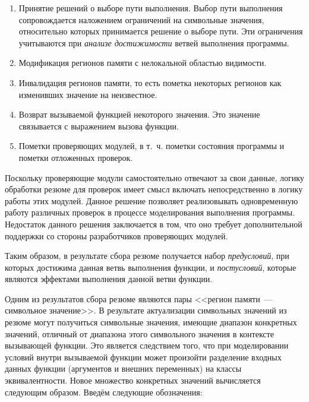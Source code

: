 \begin{enumerate}[leftmargin=1em]
 \item Принятие решений о выборе пути выполнения. Выбор пути выполнения сопровождается наложением ограничений на символьные значения, относительно которых принимается решение о выборе пути. Эти ограничения учитываются при \textit{анализе достижимости} ветвей выполнения программы.
 
 \item Модификация регионов памяти с нелокальной областью видимости.
 
 \item Инвалидация регионов памяти, то есть пометка некоторых регионов как изменивших значение на неизвестное.
 
 \item Возврат вызываемой функцией некоторого значения. Это значение связывается с выражением вызова функции.
 
 \item Пометки проверяющих модулей, в т.~ч. пометки состояния программы и пометки отложенных проверок.
 
\end{enumerate}

Поскольку проверяющие модули самостоятельно отвечают за свои данные, логику обработки резюме для проверок имеет смысл включать непосредственно в логику работы этих модулей. Данное решение позволяет реализовывать одновременную работу различных проверок в процессе моделирования выполнения программы. Недостаток данного решения заключается в том, что оно требует дополнительной поддержки со стороны разработчиков проверяющих модулей.

Таким образом, в результате сбора резюме получается набор \textit{предусловий}, при которых достижима данная ветвь выполнения функции, и \textit{постусловий}, которые являются эффектами выполнения данной ветви функции.

Одним из результатов сбора резюме являются пары <<регион памяти~--- символьное значение>>. В результате актуализации символьных значений из резюме могут получиться символьные значения, имеющие диапазон конкретных значений, отличный от диапазона этого символьного значения в контексте вызывающей функции. Это является следствием того, что при моделировании условий внутри вызываемой функции может произойти разделение входных данных функции (аргументов и внешних переменных) на классы эквивалентности. Новое множество конкретных значений вычисляется следующим образом. Введём следующие обозначения:

